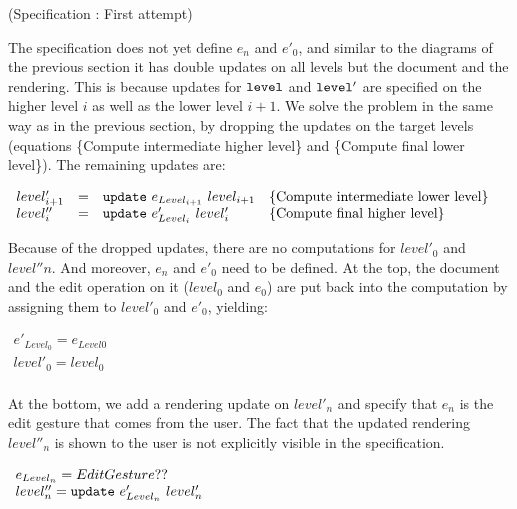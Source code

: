 \begin{center}(Specification \thespecification: First attempt)\end{center}\vspace{1em}


The specification does not yet define $e_n$ and $e'_0$, and similar to the diagrams of the previous section it has double updates on all levels but the document and the rendering. This is because updates for ${\tt level}$ and ${\tt level'}$ are specified on the higher level $i$ as well as the lower level $i+1$. We solve the problem in the same way as in the previous section, by dropping the updates on the target levels (equations \{Compute intermediate higher level\} and \{Compute final lower level\}). The remaining updates are:

\begin{small}\( \begin{array}{lcll} 
level'_{i+1} 	& = & {\tt update}~e_{Level_{i+1}}~level_{i+1}                 & \text{\{Compute intermediate lower level\}}\\
level''_{i} & = & {\tt update}~e'_{Level_{i}}~level'_{i}                 & \text{\{Compute final higher level\}}\\
\end{array}\)
\end{small}

Because of the dropped updates, there are no computations for $level'_0$ and $level''{n}$. And moreover, $e_n$ and $e'_0$ need to be defined. At the top, the document and the edit operation on it ($level_0$ and $e_0$) are put back into the computation by assigning them to $level'_0$ and $e'_0$, yielding:

\begin{small}\( \begin{array}{lcll} 
e'_{Level_{0}}  = e_{Level{0}}\\
level'_{0} =  level_{0}\\
\end{array}\)
\end{small}

At the bottom, we add a rendering update on $level'_n$ and specify that $e_n$ is the edit gesture that comes from the user. The fact that the updated rendering $level''_n$ is shown to the user is not explicitly visible in the specification.

\begin{small}\( \begin{array}{lcll} 
e_{Level_{n}}  = EditGesture ??\\
level''_{n}  =  {\tt update}~e'_{Level_{n}}~level'_{n}\\
\end{array}\)
\end{small}

